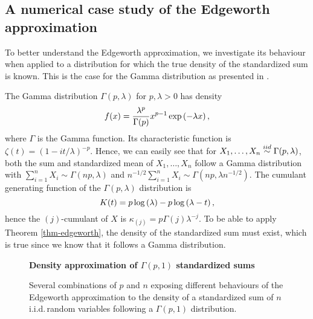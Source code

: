 \subsection{A numerical case study of the Edgeworth approximation}

To better understand the Edgeworth approximation, we investigate its behaviour when applied to a distribution for which the true density of the standardized sum is known. This is the case for the Gamma distribution as presented in \cite[Section 3.6]{kolassa2006series}.

\begin{example} \label{ex-gamma-edge}
    The Gamma distribution $\Gamma(p, \lambda)$ for $p, \lambda > 0$ has density
    \begin{equation*}
        f(x) = \frac{\lambda^p}{\Gamma(p)} x^{p-1} \exp\left(-\lambda x\right),
    \end{equation*}
    where $\Gamma$ is the Gamma function. Its characteristic function is $\zeta(t) = (1 - it/\lambda)^{-p}$. Hence, we can easily see that for $X_1, \ldots, X_n \stackrel{iid}{\sim} \Gamma(p, \lambda)$, both the sum and standardized mean of $X_1, \ldots, X_n$ follow a Gamma distribution with $\sum_{i=1}^n X_i \sim \Gamma(np, \lambda)$ and $n^{-1/2} \sum_{i=1}^n X_i \sim \Gamma(np, \lambda n^{-1/2})$. The cumulant generating function of the $\Gamma(p, \lambda)$ distribution is
    \begin{equation*}
        K(t) = p \log\left(\lambda\right) - p\log\left(\lambda - t\right),
    \end{equation*}
    hence the $(j)$-cumulant of $X$ is $\kappa_{(j)} = p\Gamma(j)\lambda^{-j}$. To be able to apply Theorem \ref{thm-edgeworth}, the density of the standardized sum must exist, which is true since we know that it follows a Gamma distribution.
    

    \begin{figure}[!htbp]
        \textbf{Density approximation of $\Gamma(p,1)$ standardized sums}
        \centering
        \qquad
        \caption{Several combinations of $p$ and $n$ exposing different behaviours of the Edgeworth approximation to the density of a standardized sum  of $n$ i.i.d.\,random variables following a $\Gamma(p, 1)$ distribution.}
        \label{fig-edgeworth}
    \end{figure}


\end{example}
